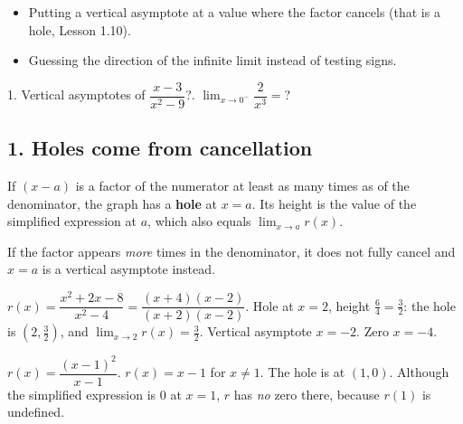\begin{mistakes}
\begin{itemize}
\item Putting a vertical asymptote at a value where the factor cancels (that is a hole, Lesson 1.10).
\item Guessing the direction of the infinite limit instead of testing signs.
\end{itemize}
\end{mistakes}

\begin{quickcheck}
1. Vertical asymptotes of $\dfrac{x-3}{x^2-9}$?. $\lim_{x\to0^-}\dfrac{2}{x^3}=$?
\end{quickcheck}


\subsection*{1. Holes come from cancellation}
\begin{keyidea}
If $(x-a)$ is a factor of the numerator at least as many times as of the denominator, the graph has a \textbf{hole} at $x=a$. Its height is the value of the simplified expression at $a$, which also equals $\lim_{x\to a}r(x)$.
\end{keyidea}
If the factor appears \emph{more} times in the denominator, it does not fully cancel and $x=a$ is a vertical asymptote instead.

\begin{example}[Example 1]
$r(x)=\dfrac{x^2+2x-8}{x^2-4}=\dfrac{(x+4)(x-2)}{(x+2)(x-2)}$.
\sol Hole at $x=2$, height $\frac{6}{4}=\frac32$: the hole is $\left(2,\frac32\right)$, and $\lim_{x\to2}r(x)=\frac32$. Vertical asymptote $x=-2$. Zero $x=-4$.
\end{example}

\begin{example}
$r(x)=\dfrac{(x-1)^2}{x-1}$.
\sol $r(x)=x-1$ for $x\neq1$. The hole is at $(1,0)$. Although the simplified expression is $0$ at $x=1$, $r$ has \emph{no} zero there, because $r(1)$ is undefined.
\begin{center}
\end{center}
\end{example}

